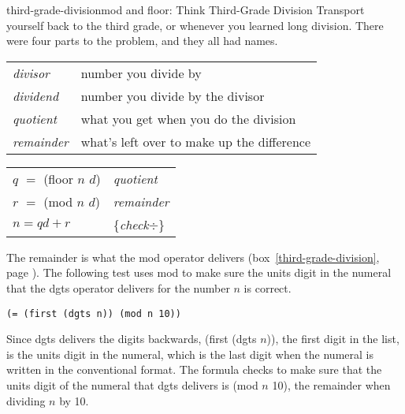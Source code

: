 \begin{aside}{third-grade-division}{\textsf{mod} and \textsf{floor}: Think Third-Grade Division}
Transport yourself back to the third grade,
or whenever you learned long division.
There were four parts to the problem, and they all had names.

\begin{tabular}{ll}
\emph{divisor}   & number you divide by \\
\emph{dividend}  & number you divide by the divisor \\
\emph{quotient}  & what you get when you do the division \\
\emph{remainder} & what's left over to make up the difference
\end{tabular}
\begin{center}
\begin{tabular}{ll}
$q$ $=$ \textsf{(floor $n$ $d$)} & \emph{quotient}  \\
$r$ $=$ \textsf{(mod $n$ $d$)}   & \emph{remainder} \\
$n = qd + r$            & \{\emph{check}$\div$\} \\
\end{tabular}
\end{center}
\end{aside}

The remainder is
what the \textsf{mod} operator delivers
(box~\ref{third-grade-division}, page \pageref{third-grade-division}).
The following test uses \textsf{mod} to make sure the units digit in the numeral
that the \textsf{dgts} operator delivers for the number $n$ is correct.
\begin{code}
\begin{verbatim}
(= (first (dgts n)) (mod n 10))
\end{verbatim}
\end{code}

Since \textsf{dgts} delivers the digits backwards,
\textsf{(first (dgts $n$))}, the first digit in the list,
is the units digit in the numeral, which is the last digit
when the numeral is written in the conventional format.
The formula checks to make sure that
the units digit of the numeral that
\textsf{dgts} delivers is \textsf{(mod $n$ 10)},
the remainder when dividing $n$ by 10.

